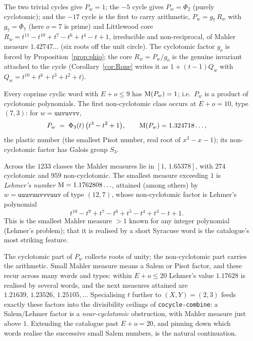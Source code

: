

The two trivial cycles give $P_w=1$; the $-5$ cycle gives $P_w=\Phi_2$ (purely cyclotomic);
and the $-17$ cycle is the first to carry arithmetic, $P_w=g_7\,R_w$ with $g_7=\Phi_7$ (here
$o=7$ is prime) and Littlewood core $R_w=t^{11}-t^{10}+t^{7}-t^{6}+t^{4}-t+1$, irreducible and
non-reciprocal, of Mahler measure $1.42747\ldots$ (six roots off the unit circle). The
cyclotomic factor $g_o$ is forced by Proposition~\ref{prop:phio}; the core $R_w=P_w/g_o$ is the
genuine invariant attached to the cycle (Corollary~\ref{cor:Rone} writes it as $1+(t-1)Q_w$ with
$Q_w=t^{10}+t^{6}+t^{3}+t^{2}+t$).

\begin{prop}\label{prop:cofrontier}
Every coprime cyclic word with $E+o\le 9$ has $\operatorname{M}(P_w)=1$; i.e.\ $P_w$ is a product of
cyclotomic polynomials. The first non-cyclotomic class occurs at $E+o=10$, type $(7,3)$: for
$w=\mathtt{uuvuvvv}$,
\[
   P_w \;=\; \Phi_3(t)\,\bigl(t^{3}-t^{2}+1\bigr),\qquad
   \operatorname{M}(P_w)=1.324718\ldots,
\]
the plastic number (the smallest Pisot number, real root of $x^{3}-x-1$); its non-cyclotomic
factor has Galois group $S_3$.
\end{prop}

\begin{prop}\label{prop:lehmer}
Across the $1233$ classes the Mahler measures lie in $[1,\,1.65378]$, with $274$ cyclotomic and
$959$ non-cyclotomic. The smallest measure exceeding $1$ is \emph{Lehmer's number}
$\operatorname{M}=1.1762808\ldots$, attained (among others) by $w=\mathtt{uuuvuuvvvuuv}$ of type
$(12,7)$, whose non-cyclotomic factor is Lehmer's polynomial
\[
   t^{10}-t^{9}+t^{7}-t^{6}+t^{5}-t^{4}+t^{3}-t+1 .
\]
This is the smallest Mahler measure $>1$ known for any integer polynomial (Lehmer's problem);
that it is realised by a short Syracuse word is the catalogue's most striking feature.
\end{prop}





\begin{rem}
The cyclotomic part of $P_w$ collects roots of unity; the non-cyclotomic part carries the
arithmetic. Small Mahler measure means a Salem or Pisot factor, and these recur across many
words and types: within $E+o\le20$ Lehmer's value $1.17628$ is realised by several words, and
the next measures attained are $1.21639,\,1.23526,\,1.25105,\ldots$ Specialising $t$ further to
$(X,Y)=(2,3)$ feeds exactly these factors into
the divisibility ceilings of \texttt{cocycle-combine}: a Salem/Lehmer factor is a
\emph{near-cyclotomic} obstruction, with Mahler measure just above $1$. Extending the catalogue
past $E+o=20$, and pinning down which words realise the successive small Salem numbers, is the
natural continuation.
\end{rem}

